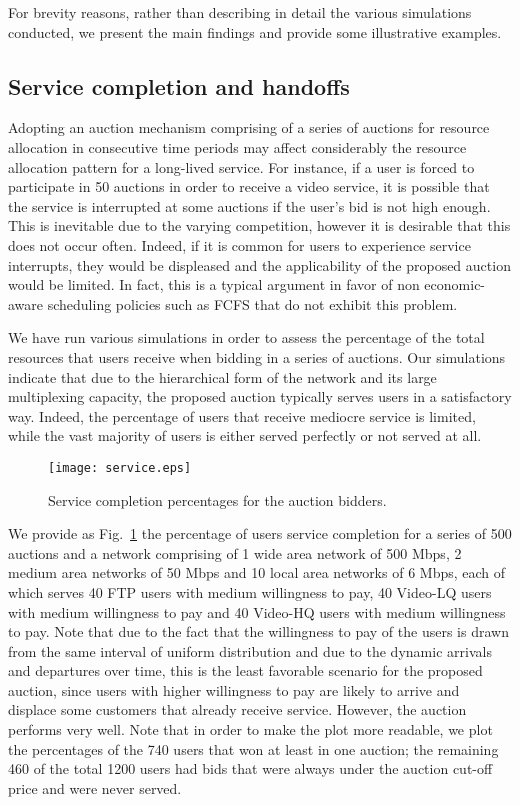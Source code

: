 \documentclass[a4paper]{article}
\begin{document}
For brevity reasons, rather than describing in detail the various simulations
conducted, we present the main findings and provide some illustrative examples.

\subsection{Service completion and handoffs}

Adopting an auction mechanism comprising of a series of auctions for resource
allocation in consecutive time periods may affect considerably the resource
allocation pattern for a long-lived service. For instance, if a user is forced
to participate in 50 auctions in order to receive a video service, it is possible
that the service is interrupted at some auctions if the user's bid is not
high enough. This is inevitable due to the varying competition, however it is
desirable that this does not occur often. Indeed, if it is common for users 
to experience service interrupts, they would be displeased and the applicability
of the proposed auction would be limited. In fact, this is a typical argument
in favor of non economic-aware scheduling policies such as FCFS that do not
exhibit this problem.

We have run various simulations in order to assess the percentage of the
total resources that users receive when bidding in a series of auctions.
Our simulations indicate that due to the hierarchical form of the network
and its large multiplexing capacity, the proposed auction typically serves
users in a satisfactory way. Indeed, the percentage of users that receive 
mediocre service is limited, while the vast majority of users is either 
served perfectly or not served at all. 

\begin{figure}[htbp]
	\centering\texttt{[image: service.eps]}
	\caption{Service completion percentages for the auction bidders.}
	\label{fig:service}
\end{figure}

We provide as Fig.~\ref{fig:service}  the percentage of users
service completion for  a series of 500 auctions and a network comprising of
1 wide area network of 500 Mbps, 2 medium area networks of 50 Mbps and
10 local area networks of 6 Mbps, each of which serves 40 FTP users with
medium willingness to pay, 40 Video-LQ users with medium willingness to pay and
40 Video-HQ users with medium willingness to pay. Note that due to the fact
that the willingness to pay of the users is drawn from the same interval
of uniform distribution and due to the dynamic arrivals and departures over
time, this is the least favorable scenario for the proposed auction, since 
users with higher willingness to pay are likely to arrive and displace some
customers that already receive service. However, the auction performs very
well. Note that in order to make the plot more readable, we plot the percentages
of the 740 users that won at least in one auction; the remaining 460 of the total
1200 users had bids that were always under the auction cut-off price and were
never served.
\end{document}
